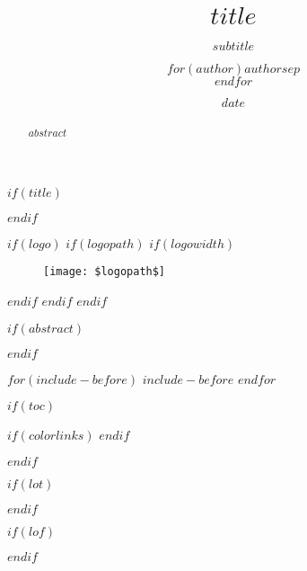\documentclass[$if(fontsize)$$fontsize$,$endif$$if(lang)$$babel-lang$,$endif$$if(papersize)$$papersize$paper,$endif$$for(classoption)$$classoption$$sep$,$endfor$]{$documentclass$}
\title{$title$}
\title{}
\subtitle{$subtitle$}
\author{$for(author)$$author$$sep$ \\ $endfor$}
\author{}
\date{$date$}
\date{}
\begin{document}
$if(title)$
\maketitle
$endif$


$if(logo)$
$if(logopath)$
$if(logowidth)$
\begin{figure}[H]
\centering
\texttt{[image: \$logopath\$]}
\end{figure}

$endif$
$endif$
$endif$

$if(abstract)$
\begin{abstract}
$abstract$
\end{abstract}
$endif$


$for(include-before)$
$include-before$
$endfor$


$if(toc)$
{
$if(colorlinks)$
\hypersetup{linkcolor=$if(toccolor)$$toccolor$$else$black$endif$}
$endif$
\setcounter{tocdepth}{$toc-depth$}

        {
                {\renewcommand{\contentsname}{Sommaire}}} %
        { }
{}

\tableofcontents
}
$endif$


$if(lot)$
\listoftables
$endif$

$if(lof)$
\listoffigures
$endif$


\end{document}
